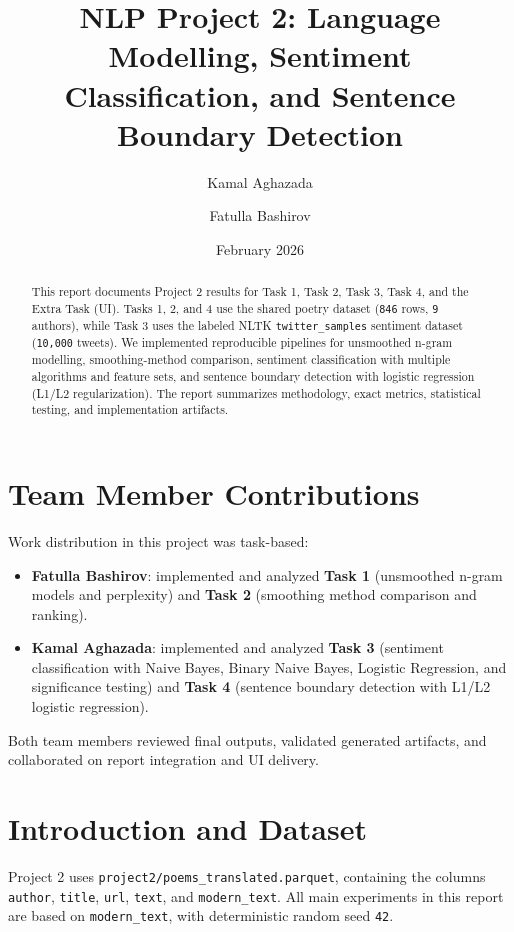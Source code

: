 \documentclass[10pt,a4paper]{article}
\title{NLP Project 2: Language Modelling, Sentiment Classification, and Sentence Boundary Detection}
\author{Kamal Aghazada \and Fatulla Bashirov}
\date{February 2026}
\begin{document}
\maketitle

\begin{abstract}
This report documents Project 2 results for Task 1, Task 2, Task 3, Task 4, and the Extra Task (UI). Tasks 1, 2, and 4 use the shared poetry dataset (\texttt{846} rows, \texttt{9} authors), while Task 3 uses the labeled NLTK \texttt{twitter\_samples} sentiment dataset (\texttt{10,000} tweets). We implemented reproducible pipelines for unsmoothed n-gram modelling, smoothing-method comparison, sentiment classification with multiple algorithms and feature sets, and sentence boundary detection with logistic regression (L1/L2 regularization). The report summarizes methodology, exact metrics, statistical testing, and implementation artifacts.
\end{abstract}

\section{Team Member Contributions}

Work distribution in this project was task-based:
\begin{itemize}
    \item \textbf{Fatulla Bashirov}: implemented and analyzed \textbf{Task 1} (unsmoothed n-gram models and perplexity) and \textbf{Task 2} (smoothing method comparison and ranking).
    \item \textbf{Kamal Aghazada}: implemented and analyzed \textbf{Task 3} (sentiment classification with Naive Bayes, Binary Naive Bayes, Logistic Regression, and significance testing) and \textbf{Task 4} (sentence boundary detection with L1/L2 logistic regression).
\end{itemize}

Both team members reviewed final outputs, validated generated artifacts, and collaborated on report integration and UI delivery.

\section{Introduction and Dataset}

Project 2 uses \texttt{project2/poems\_translated.parquet}, containing the columns \texttt{author}, \texttt{title}, \texttt{url}, \texttt{text}, and \texttt{modern\_text}. All main experiments in this report are based on \texttt{modern\_text}, with deterministic random seed \texttt{42}.
\end{document}
